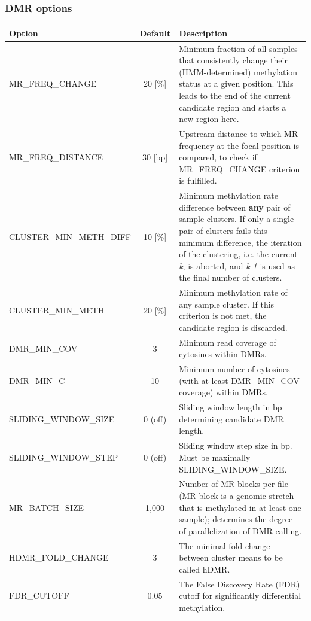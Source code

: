 \documentclass{article}
\begin{document}
\newpage
\subsubsection*{DMR options}

\begin{longtable}[h]{lcp{8cm}}
	\toprule
	\bf Option & \bf Default & \bf Description\\ \midrule
	MR\_FREQ\_CHANGE & 20 [\%] & Minimum fraction of all samples that consistently change their (HMM-determined) methylation status at a given position. This leads to the end of the current candidate region and starts a new region here.\\
	MR\_FREQ\_DISTANCE & 30 [bp] & Upstream distance to which MR frequency at the focal position is compared, to check if MR\_FREQ\_CHANGE criterion is fulfilled.\\
	CLUSTER\_MIN\_METH\_DIFF & 10 [\%] & Minimum methylation rate difference between \textbf{any} pair of sample clusters. If only a single pair of clusters fails this minimum difference, the iteration of the clustering, i.e. the current \textit{k}, is aborted, and \textit{k-1} is used as the final number of clusters.\\
	CLUSTER\_MIN\_METH & 20 [\%] & Minimum methylation rate of any sample cluster. If this criterion is not met, the candidate region is discarded.\\
	DMR\_MIN\_COV & 3 & Minimum read coverage of cytosines within DMRs.\\
	DMR\_MIN\_C & 10 & Minimum number of cytosines (with at least DMR\_MIN\_COV coverage) within DMRs.\\
	SLIDING\_WINDOW\_SIZE & 0 (off) & Sliding window length in bp determining candidate DMR length.\\
	SLIDING\_WINDOW\_STEP & 0 (off) & Sliding window step size in bp. Must be maximally SLIDING\_WINDOW\_SIZE.\\
	MR\_BATCH\_SIZE & 1,000 & Number of MR blocks per file (MR block is a genomic stretch that is methylated in at least one sample); determines the degree of parallelization of DMR calling.\\
	HDMR\_FOLD\_CHANGE & 3 & The minimal fold change between cluster means to be called hDMR.\\
	FDR\_CUTOFF & 0.05 & The False Discovery Rate (FDR) cutoff for significantly differential methylation.\\
	\bottomrule
\end{longtable}
\end{document}
